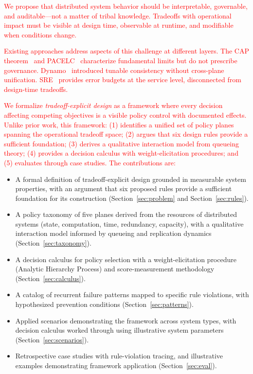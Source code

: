 \documentclass[conference]{IEEEtran}
\begin{document}
\textcolor{red}{We propose that distributed system behavior should be interpretable, governable, and auditable---not a matter of tribal knowledge. Tradeoffs with operational impact must be visible at design time, observable at runtime, and modifiable when conditions change.}

\textcolor{red}{Existing approaches address aspects of this challenge at different layers. The CAP theorem~\cite{brewer2000cap,gilbert2002brewer,brewer2012cap} and PACELC~\cite{pacelc} characterize fundamental limits but do not prescribe governance. Dynamo~\cite{dynamo} introduced tunable consistency without cross-plane unification. SRE~\cite{sre} provides error budgets at the service level, disconnected from design-time tradeoffs.}

\textcolor{red}{We formalize \textit{tradeoff-explicit design} as a framework where every decision affecting competing objectives is a visible policy control with documented effects. Unlike prior work, this framework: (1) identifies a unified set of policy planes spanning the operational tradeoff space; (2) argues that six design rules provide a sufficient foundation; (3) derives a qualitative interaction model from queueing theory; (4) provides a decision calculus with weight-elicitation procedures; and (5) evaluates through case studies. The contributions are:}

{\color{red}
\begin{itemize}
    \item A formal definition of tradeoff-explicit design grounded in measurable system properties, with an argument that six proposed rules provide a sufficient foundation for its construction (Section~\ref{sec:problem} and Section~\ref{sec:rules}).
    \item A policy taxonomy of five planes derived from the resources of distributed systems (state, computation, time, redundancy, capacity), with a qualitative interaction model informed by queueing and replication dynamics (Section~\ref{sec:taxonomy}).
    \item A decision calculus for policy selection with a weight-elicitation procedure (Analytic Hierarchy Process) and score-measurement methodology (Section~\ref{sec:calculus}).
    \item A catalog of recurrent failure patterns mapped to specific rule violations, with hypothesized prevention conditions (Section~\ref{sec:patterns}).
    \item Applied scenarios demonstrating the framework across system types, with decision calculus worked through using illustrative system parameters (Section~\ref{sec:scenarios}).
    \item Retrospective case studies with rule-violation tracing, and illustrative examples demonstrating framework application (Section~\ref{sec:eval}).
\end{itemize}}
\end{document}
